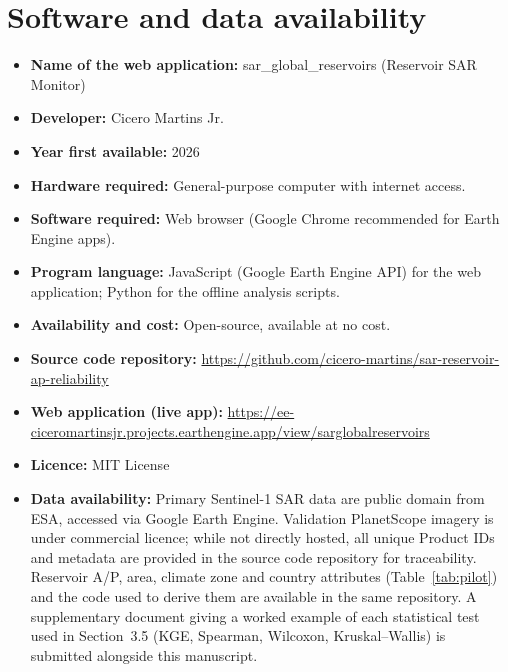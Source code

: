 \documentclass[review,12pt,authoryear]{elsarticle}
\begin{document}
\section*{Software and data availability}
\begin{itemize}
  \item \textbf{Name of the web application:} sar\_global\_reservoirs (Reservoir SAR Monitor)
  \item \textbf{Developer:} Cicero Martins Jr.
  \item \textbf{Year first available:} 2026
  \item \textbf{Hardware required:} General-purpose computer with internet access.
  \item \textbf{Software required:} Web browser (Google Chrome recommended for Earth Engine apps).
  \item \textbf{Program language:} JavaScript (Google Earth Engine API) for the
  web application; Python for the offline analysis scripts.
  \item \textbf{Availability and cost:} Open-source, available at no cost.
  \item \textbf{Source code repository:} \url{https://github.com/cicero-martins/sar-reservoir-ap-reliability}
  \item \textbf{Web application (live app):} \url{https://ee-ciceromartinsjr.projects.earthengine.app/view/sarglobalreservoirs}
  \item \textbf{Licence:} MIT License
  \item \textbf{Data availability:} Primary Sentinel-1 SAR data are public
  domain from ESA, accessed via Google Earth Engine. Validation PlanetScope
  imagery is under commercial licence; while not directly hosted, all unique
  Product IDs and metadata are provided in the source code repository for
  traceability. Reservoir A/P, area, climate zone and country attributes
  (Table~\ref{tab:pilot}) and the code used to derive them are available in
  the same repository. A supplementary document giving a worked example of
  each statistical test used in Section~3.5 (KGE, Spearman, Wilcoxon,
  Kruskal--Wallis) is submitted alongside this manuscript.
\end{itemize}


\end{document}
